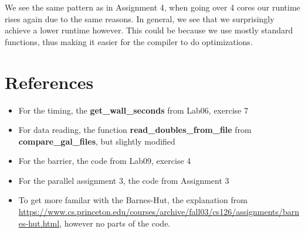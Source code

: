 \documentclass[a4paper]{scrartcl}
\begin{document}
            We see the same pattern as in Assignment 4, when going over 4 cores
            our runtime rises again due to the same reasons. In general, we see
            that we surprisingly achieve a lower runtime however. This could be
            because we use mostly standard functions, thus making it easier for
            the compiler to do optimizations.



            

\section{References}
    \begin{itemize}
        \item For the timing, the \textbf{get\_wall\_seconds} from Lab06, exercise 7
        \item For data reading, the function \textbf{read\_doubles\_from\_file} from \textbf{compare\_gal\_files}, but slightly modified
        \item For the barrier, the code from Lab09, exercise 4
        \item For the parallel assignment 3, the code from Assignment 3
        \item To get more familar with the Barnes-Hut, the explanation from
        \url{https://www.cs.princeton.edu/courses/archive/fall03/cs126/assignments/barnes-hut.html},
        however no parts of the code.
    \end{itemize}
\end{document}
